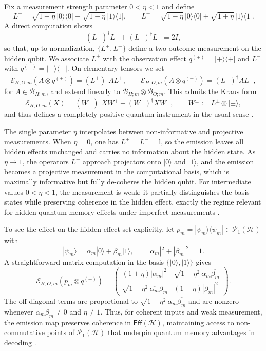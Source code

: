 \documentclass[12pt, reco]{article}
\begin{document}
Fix a measurement strength parameter \(0<\eta<1\) and define
\[
L^{+}
  = \sqrt{1+\eta}\,|0\rangle\langle0|
    + \sqrt{1-\eta}\,|1\rangle\langle1|,
\qquad
L^{-}
  = \sqrt{1-\eta}\,|0\rangle\langle0|
    + \sqrt{1+\eta}\,|1\rangle\langle1|.
\]
A direct computation shows
\[
(L^{+})^\dagger L^{+} + (L^{-})^\dagger L^{-} = 2I,
\]
so that, up to normalization, \(\{L^{+},L^{-}\}\) define a two-outcome measurement on the hidden qubit. We associate \(L^{+}\) with the observation effect \(q^{(+)} = |+\rangle\langle+|\) and \(L^{-}\) with \(q^{(-)} = |-\rangle\langle-|\). On elementary tensors we set
\[
\mathcal{E}_{H,O;m}(A\otimes q^{(+)})
  = (L^{+})^\dagger A L^{+},
\qquad
\mathcal{E}_{H,O;m}(A\otimes q^{(-)})
  = (L^{-})^\dagger A L^{-},
\]
for \(A\in\mathcal{B}_{H;m}\), and extend linearly to \(\mathcal{B}_{H;m}\otimes\mathcal{B}_{O;m}\). This admits the Kraus form
\[
\mathcal{E}_{H,O;m}(X)
  = (W^{+})^\dagger X W^{+} + (W^{-})^\dagger X W^{-},
\qquad
W^{\pm} := L^{\pm}\otimes|\pm\rangle,
\]
and thus defines a completely positive quantum instrument in the usual sense \cite{Nielsen2000}.

The single parameter \(\eta\) interpolates between non-informative and projective measurements. When \(\eta=0\), one has \(L^{+} = L^{-} = \mathbb{I}\), so the emission leaves all hidden effects unchanged and carries no information about the hidden state. As \(\eta\to 1\), the operators \(L^{\pm}\) approach projectors onto \(|0\rangle\) and \(|1\rangle\), and the emission becomes a projective measurement in the computational basis, which is maximally informative but fully de-coheres the hidden qubit. For intermediate values \(0<\eta<1\), the measurement is weak: it partially distinguishes the basis states while preserving coherence in the hidden effect, exactly the regime relevant for hidden quantum memory effects under imperfect measurements \cite{Monras11,TaElM,TaBra25}.

To see the effect on the hidden effect set explicitly, let \(p_m = |\psi_m\rangle\langle\psi_m| \in \mathcal{P}_1(\mathcal{H})\) with
\[
|\psi_m\rangle = \alpha_m|0\rangle + \beta_m|1\rangle,
\qquad
|\alpha_m|^2 + |\beta_m|^2 = 1.
\]
A straightforward matrix computation in the basis \(\{|0\rangle,|1\rangle\}\) gives
\[
\mathcal{E}_{H,O;m}(p_m\otimes q^{(+)})
=
\begin{pmatrix}
(1+\eta)|\alpha_m|^2 & \sqrt{1-\eta^2}\,\alpha_m\overline{\beta_m} \\
\sqrt{1-\eta^2}\,\overline{\alpha_m}\beta_m & (1-\eta)|\beta_m|^2
\end{pmatrix}.
\]
The off-diagonal terms are proportional to \(\sqrt{1-\eta^2}\,\alpha_m\overline{\beta_m}\) and are nonzero whenever \(\alpha_m\beta_m\neq 0\) and \(\eta\neq 1\). Thus, for coherent inputs and weak measurement, the emission map preserves coherence in \(\mathsf{Eff}(\mathcal{H})\), maintaining access to non-commutative points of \(\mathcal{P}_1(\mathcal{H})\) that underpin quantum memory advantages in decoding \cite{TaElM,TaBra25,OZNPQ26}.
 
\end{document}
